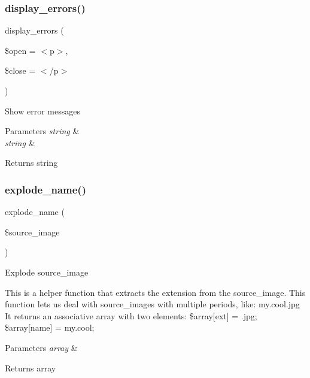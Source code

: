 \subsubsection{\texorpdfstring{display\+\_\+errors()}{display\_errors()}}
{\footnotesize\ttfamily display\+\_\+errors (\begin{DoxyParamCaption}\item[{}]{\$open = {\ttfamily \textquotesingle{}$<$p$>$\textquotesingle{}},  }\item[{}]{\$close = {\ttfamily \textquotesingle{}$<$/p$>$\textquotesingle{}} }\end{DoxyParamCaption})}

Show error messages


\begin{DoxyParams}{Parameters}
{\em string} & \\
\hline
{\em string} & \\
\hline
\end{DoxyParams}
\begin{DoxyReturn}{Returns}
string 
\end{DoxyReturn}
\mbox{\label{class_c_i___image__lib_a32661288e0bea18ea50fbb7be6535af5}} 
\subsubsection{\texorpdfstring{explode\+\_\+name()}{explode\_name()}}
{\footnotesize\ttfamily explode\+\_\+name (\begin{DoxyParamCaption}\item[{}]{\$source\+\_\+image }\end{DoxyParamCaption})}

Explode source\+\_\+image

This is a helper function that extracts the extension from the source\+\_\+image. This function lets us deal with source\+\_\+images with multiple periods, like\+: my.\+cool.\+jpg It returns an associative array with two elements\+: \$array\mbox{[}\textquotesingle{}ext\textquotesingle{}\mbox{]} = \textquotesingle{}.jpg\textquotesingle{}; \$array\mbox{[}\textquotesingle{}name\textquotesingle{}\mbox{]} = \textquotesingle{}my.\+cool\textquotesingle{};


\begin{DoxyParams}{Parameters}
{\em array} & \\
\hline
\end{DoxyParams}
\begin{DoxyReturn}{Returns}
array 
\end{DoxyReturn}
\mbox{\label{class_c_i___image__lib_a04376d5530f38a1a61f59c2d769284ba}} 
